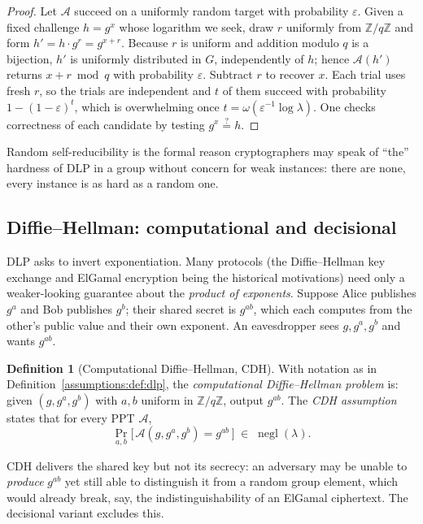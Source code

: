 \documentclass[11pt,a4paper]{article}
\theoremstyle{definition}
\newtheorem{definition}[theorem]{Definition}
\theoremstyle{remark}
\newcommand{\Z}{\ensuremath{\mathbb{Z}}}
\DeclareMathOperator{\negl}{negl}
\begin{document}
\begin{proof}
Let \(\mathcal A\) succeed on a uniformly random target with probability \(\varepsilon\). Given a fixed challenge \(h = g^x\) whose logarithm we seek, draw \(r\) uniformly from \(\Z/q\Z\) and form \(h' = h \cdot g^{r} = g^{x + r}\). Because \(r\) is uniform and addition modulo \(q\) is a bijection, \(h'\) is uniformly distributed in \(G\), independently of \(h\); hence \(\mathcal A(h')\) returns \(x + r \bmod q\) with probability \(\varepsilon\). Subtract \(r\) to recover \(x\). Each trial uses fresh \(r\), so the trials are independent and \(t\) of them succeed with probability \(1 - (1-\varepsilon)^t\), which is overwhelming once \(t = \omega(\varepsilon^{-1}\log\lambda)\). One checks correctness of each candidate by testing \(g^{x} \stackrel{?}{=} h\).
\end{proof}

Random self-reducibility is the formal reason cryptographers may speak of ``the'' hardness of DLP in a group without concern for weak instances: there are none, every instance is as hard as a random one.

\subsection{Diffie--Hellman: computational and decisional}
\label{assumptions:subsec:dh}

DLP asks to invert exponentiation. Many protocols (the Diffie--Hellman key exchange and ElGamal encryption being the historical motivations) need only a weaker-looking guarantee about the \emph{product of exponents}. Suppose Alice publishes \(g^a\) and Bob publishes \(g^b\); their shared secret is \(g^{ab}\), which each computes from the other's public value and their own exponent. An eavesdropper sees \(g, g^a, g^b\) and wants \(g^{ab}\).

\begin{definition}[Computational Diffie--Hellman, CDH]
\label{assumptions:def:cdh}
With notation as in Definition~\ref{assumptions:def:dlp}, the \emph{computational Diffie--Hellman problem} is: given \((g, g^a, g^b)\) with \(a, b\) uniform in \(\Z/q\Z\), output \(g^{ab}\). The \emph{CDH assumption} states that for every PPT \(\mathcal A\),
\[
\Pr_{a,b}\!\bigl[\, \mathcal A(g, g^a, g^b) = g^{ab} \,\bigr] \;\in\; \negl(\lambda).
\]
\end{definition}

CDH delivers the shared key but not its secrecy: an adversary may be unable to \emph{produce} \(g^{ab}\) yet still able to distinguish it from a random group element, which would already break, say, the indistinguishability of an ElGamal ciphertext. The decisional variant excludes this.
\end{document}
